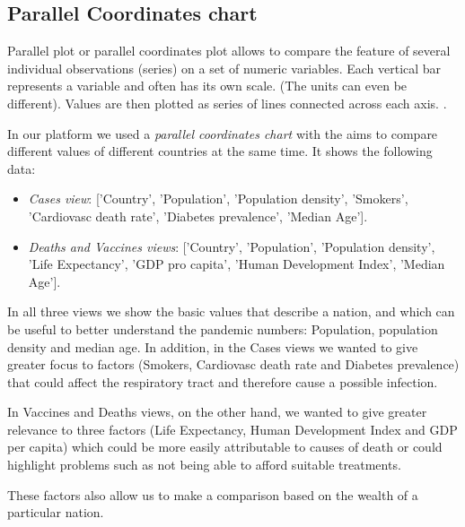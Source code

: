 \documentclass[10pt,conference]{IEEEtran}
\begin{document}
\subsection{Parallel Coordinates chart}
Parallel plot or parallel coordinates plot allows to compare the feature of several individual observations (series) on a set of numeric variables. Each vertical bar represents a variable and often has its own scale. (The units can even be different). Values are then plotted as series of lines connected across each axis. \cite{paral}.

In our platform we used a {\em parallel coordinates chart} with the aims to compare different values of different countries at the same time. 
It shows the following data:
\begin{itemize}
	\item {\em Cases view}: ['Country', 'Population', 'Population density', 'Smokers', 'Cardiovasc death rate', 'Diabetes prevalence', 'Median Age']. 
	\item {\em Deaths and Vaccines views}: ['Country', 'Population', 'Population density', 'Life Expectancy', 'GDP pro capita', 'Human Development Index', 'Median Age']. 
\end{itemize}

In all three views we show the basic values that describe a nation, and which can be useful to better understand the pandemic numbers: Population, population density and median age. In addition, in the Cases views we wanted to give greater focus to factors (Smokers, Cardiovasc death rate and Diabetes prevalence) that could affect the respiratory tract and therefore cause a possible infection.

In Vaccines and Deaths views, on the other hand, we wanted to give greater relevance to three factors (Life Expectancy, Human Development Index and GDP per capita) which could be more easily attributable to causes of death or could highlight problems such as not being able to afford suitable treatments.

These factors also allow us to make a comparison based on the wealth of a particular nation.

\begin{figure}
\end{figure}
\end{document}
